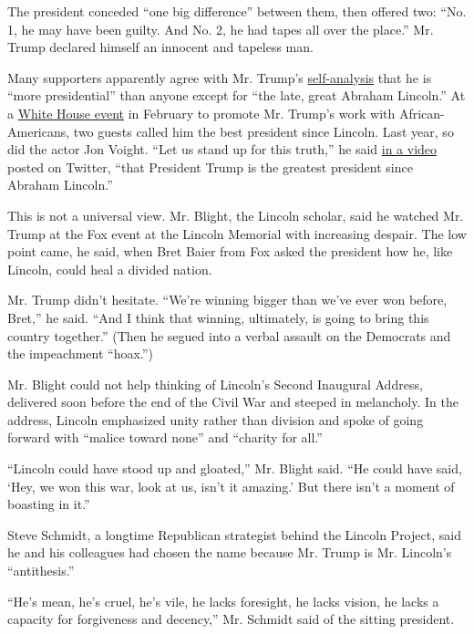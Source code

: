 The president conceded ``one big difference'' between them, then offered
two: ``No. 1, he may have been guilty. And No. 2, he had tapes all over
the place.'' Mr. Trump declared himself an innocent and tapeless man.

Many supporters apparently agree with Mr. Trump's
\href{https://people.com/politics/jon-voight-argues-trump-greatest-president-since-lincoln/}{self-analysis}
that he is ``more presidential'' than anyone except for ``the late,
great Abraham Lincoln.'' At a
\href{https://www.youtube.com/watch?v=syKkvZmKbQc}{White House event} in
February to promote Mr. Trump's work with African-Americans, two guests
called him the best president since Lincoln. Last year, so did the actor
Jon Voight. ``Let us stand up for this truth,'' he said
\href{https://people.com/politics/jon-voight-argues-trump-greatest-president-since-lincoln/}{in
a video} posted on Twitter, ``that President Trump is the greatest
president since Abraham Lincoln.''

This is not a universal view. Mr. Blight, the Lincoln scholar, said he
watched Mr. Trump at the Fox event at the Lincoln Memorial with
increasing despair. The low point came, he said, when Bret Baier from
Fox asked the president how he, like Lincoln, could heal a divided
nation.

Mr. Trump didn't hesitate. ``We're winning bigger than we've ever won
before, Bret,'' he said. ``And I think that winning, ultimately, is
going to bring this country together.'' (Then he segued into a verbal
assault on the Democrats and the impeachment ``hoax.'')

Mr. Blight could not help thinking of Lincoln's Second Inaugural
Address, delivered soon before the end of the Civil War and steeped in
melancholy. In the address, Lincoln emphasized unity rather than
division and spoke of going forward with ``malice toward none'' and
``charity for all.''

``Lincoln could have stood up and gloated,'' Mr. Blight said. ``He could
have said, `Hey, we won this war, look at us, isn't it amazing.' But
there isn't a moment of boasting in it.''

Steve Schmidt, a longtime Republican strategist behind the Lincoln
Project, said he and his colleagues had chosen the name because Mr.
Trump is Mr. Lincoln's ``antithesis.''

``He's mean, he's cruel, he's vile, he lacks foresight, he lacks vision,
he lacks a capacity for forgiveness and decency,'' Mr. Schmidt said of
the sitting president.

